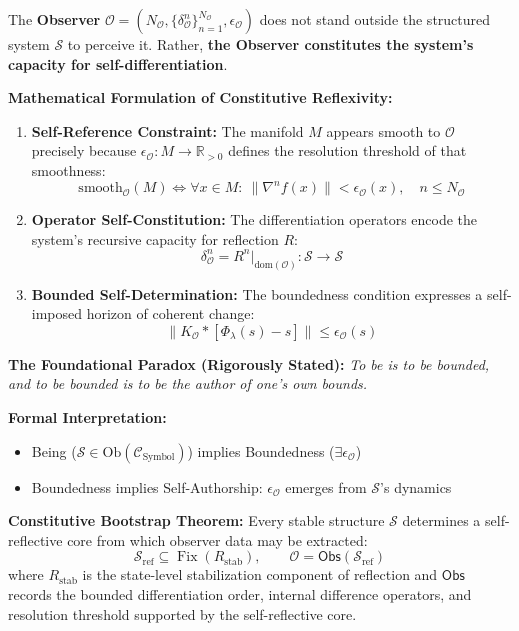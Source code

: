 \begin{tcolorbox}[breakable, title=Foundational Scholium — The Constitutive Reflex, colback=blue!5!white, colframe=blue!75!black, fonttitle=\bfseries]
\label{scholium:bk1_constitutive_reflex_tcolorbox}
The \textbf{Observer} $\mathcal{O} = (N_\mathcal{O}, \{\delta^n_\mathcal{O}\}_{n=1}^{N_\mathcal{O}}, \epsilon_\mathcal{O})$ does not stand outside the structured system $\mathcal{S}$ to perceive it. Rather, \textbf{the Observer constitutes the system's capacity for self-differentiation}.

\textbf{Mathematical Formulation of Constitutive Reflexivity:}
\begin{enumerate}
\item \textbf{Self-Reference Constraint:} The manifold $M$ appears smooth to $\mathcal{O}$ precisely because $\epsilon_\mathcal{O}: M \to \mathbb{R}_{>0}$ defines the resolution threshold of that smoothness:
\[
\text{smooth}_\mathcal{O}(M) \iff \forall x \in M:\ \|\nabla^n f(x)\| < \epsilon_\mathcal{O}(x),\quad n \leq N_\mathcal{O}
\]

\item \textbf{Operator Self-Constitution:} The differentiation operators encode the system’s recursive capacity for reflection $R$:
\[
\delta^n_\mathcal{O} = R^n|_{\text{dom}(\mathcal{O})} : \mathcal{S} \to \mathcal{S}
\]

\item \textbf{Bounded Self-Determination:} The boundedness condition expresses a self-imposed horizon of coherent change:
\[
\|K_\mathcal{O} \ast [\Phi_\lambda(s) - s]\| \leq \epsilon_\mathcal{O}(s)
\]
\end{enumerate}

\textbf{The Foundational Paradox (Rigorously Stated):} \emph{To be is to be bounded, and to be bounded is to be the author of one’s own bounds.}

\textbf{Formal Interpretation:}
\begin{itemize}
\item Being ($\mathcal{S} \in \text{Ob}(\mathcal{C}_\text{Symbol})$) implies Boundedness ($\exists \epsilon_\mathcal{O}$)
\item Boundedness implies Self-Authorship: $\epsilon_\mathcal{O}$ emerges from $\mathcal{S}$’s dynamics
\end{itemize}

\textbf{Constitutive Bootstrap Theorem:} Every stable structure $\mathcal{S}$ determines a self-reflective core from which observer data may be extracted:
\[
\mathcal{S}_{\mathrm{ref}} \subseteq \operatorname{Fix}(R_{\mathrm{stab}}),
\qquad
\mathcal{O}=\mathsf{Obs}(\mathcal{S}_{\mathrm{ref}})
\]
where \(R_{\mathrm{stab}}\) is the state-level stabilization component of reflection and \(\mathsf{Obs}\) records the bounded differentiation order, internal difference operators, and resolution threshold supported by the self-reflective core.


\end{tcolorbox}
